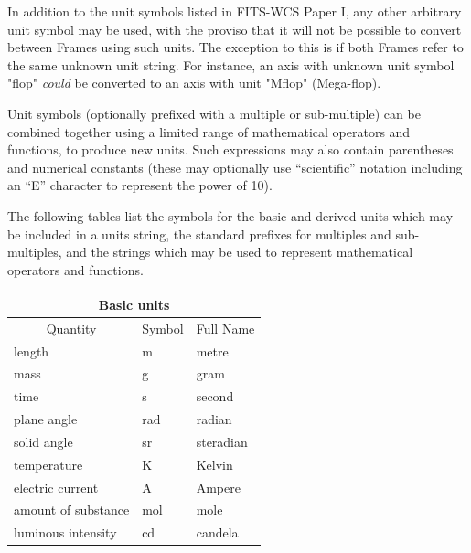 \documentclass[twoside,11pt]{starlink}
\begin{document}
In addition to the unit symbols listed in FITS-WCS Paper I, any other
arbitrary unit symbol may be used, with the proviso that it will not be
possible to convert between Frames using such units. The exception to
this is if both Frames refer to the same unknown unit string. For instance,
an axis with unknown unit symbol "flop" \emph{could} be converted to an axis
with  unit "Mflop" (Mega-flop).

Unit symbols (optionally prefixed with a multiple or sub-multiple) can be
combined together using a limited range of mathematical operators and
functions, to produce new units. Such expressions may also contain
parentheses and numerical constants (these may optionally use
``scientific'' notation including an ``E'' character to represent the
power of 10).

The following tables list the symbols for the basic and derived units which
may be included in a units string, the standard prefixes for multiples
and sub-multiples, and the strings which may be used to represent
mathematical operators and functions.

\begin{table}[htbp]
\begin{center}
\begin{tabular}{|l|l|l|}
\hline
\multicolumn{3}{|c|}{{\large Basic units}} \\ \hline
\multicolumn{1}{|c|}{Quantity} & \multicolumn{1}{|c|}{Symbol} &
\multicolumn{1}{c|}{Full Name} \\ \hline
length              & m   & metre \\
mass                & g   & gram \\
time                & s   & second \\
plane angle         & rad & radian \\
solid angle         & sr  & steradian \\
temperature         & K   & Kelvin \\
electric current    & A   & Ampere \\
amount of substance & mol & mole \\
luminous intensity  & cd  & candela \\
\hline
\end{tabular}
\end{center}
\end{table}
\end{document}
